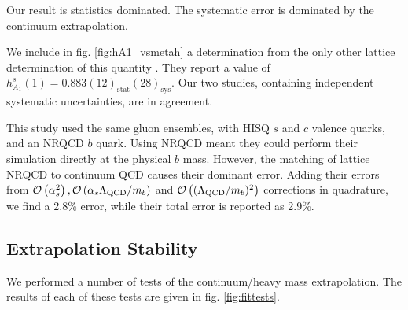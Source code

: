 Our result is statistics dominated. The systematic error is dominated by the continuum extrapolation. 

We include in fig. \ref{fig:hA1_vsmetah} a determination from the only other lattice determination of this quantity \cite{Harrison:2017fmw}. They report a value of $h_{A_1}^s(1) = 0.883(12)_{\text{stat}}(28)_{\text{sys}}$. Our two studies, containing independent systematic uncertainties, are in agreement.

This study used the same gluon ensembles, with HISQ $s$ and $c$ valence quarks, and an NRQCD $b$ quark. Using NRQCD meant they could perform their simulation directly at the physical $b$ mass. However, the matching of lattice NRQCD to continuum QCD causes their dominant error. Adding their errors from $\mathcal{O}\left( \alpha_s^2 \right),\mathcal{O}\left( \alpha_s \Lambda_{\text{QCD}}/m_b \right)$ and $\mathcal{O}\left( (\Lambda_{\text{QCD}}/m_b)^2 \right)$ corrections in quadrature, we find a 2.8\% error, while their total error is reported as 2.9\%.

\subsection{Extrapolation Stability}
\label{sec:stability}

We performed a number of tests of the continuum/heavy mass extrapolation. The results of each of these tests are given in fig. \ref{fig:fittests}.

